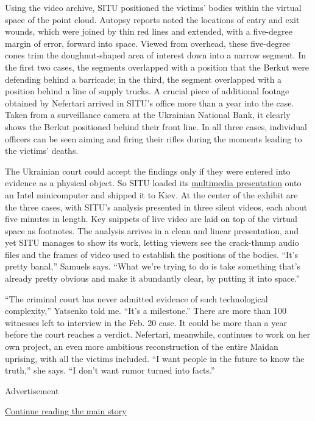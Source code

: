 Using the video archive, SITU positioned the victims' bodies within the
virtual space of the point cloud. Autopsy reports noted the locations of
entry and exit wounds, which were joined by thin red lines and extended,
with a five-degree margin of error, forward into space. Viewed from
overhead, these five-degree cones trim the doughnut-shaped area of
interest down into a narrow segment. In the first two cases, the
segments overlapped with a position that the Berkut were defending
behind a barricade; in the third, the segment overlapped with a position
behind a line of supply trucks. A crucial piece of additional footage
obtained by Nefertari arrived in SITU's office more than a year into the
case. Taken from a surveillance camera at the Ukrainian National Bank,
it clearly shows the Berkut positioned behind their front line. In all
three cases, individual officers can be seen aiming and firing their
rifles during the moments leading to the victims' deaths.

The Ukrainian court could accept the findings only if they were entered
into evidence as a physical object. So SITU loaded its
\href{http://maidan.situplatform.com/}{multimedia presentation} onto an
Intel minicomputer and shipped it to Kiev. At the center of the exhibit
are the three cases, with SITU's analysis presented in three silent
videos, each about five minutes in length. Key snippets of live video
are laid on top of the virtual space as footnotes. The analysis arrives
in a clean and linear presentation, and yet SITU manages to show its
work, letting viewers see the crack-thump audio files and the frames of
video used to establish the positions of the bodies. ``It's pretty
banal,'' Samuels says. ``What we're trying to do is take something
that's already pretty obvious and make it abundantly clear, by putting
it into space.''

``The criminal court has never admitted evidence of such technological
complexity,'' Yatsenko told me. ``It's a milestone.'' There are more
than 100 witnesses left to interview in the Feb. 20 case. It could be
more than a year before the court reaches a verdict. Nefertari,
meanwhile, continues to work on her own project, an even more ambitious
reconstruction of the entire Maidan uprising, with all the victims
included. ``I want people in the future to know the truth,'' she says.
``I don't want rumor turned into facts.''

Advertisement

\protect\hyperlink{after-bottom}{Continue reading the main story}

